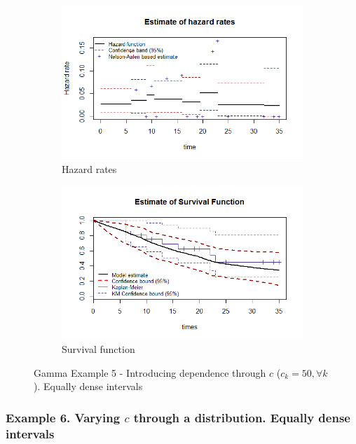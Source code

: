 \documentclass[letterpaper]{article}
\begin{document}
\begin{figure}
  \centering
  \begin{subfigure}[a]{\textwidth}\centering
    \includegraphics[width=\textwidth]{G51.png}
    \caption{Hazard rates}
  \end{subfigure}
  \begin{subfigure}[b]{\textwidth}\centering
    \includegraphics[width=\textwidth]{G52.png}
    \caption{Survival function}
  \end{subfigure}
  \caption{Gamma Example 5 - Introducing dependence through $c$ ($c_k=50, \forall k$). Equally dense intervals}
  \label{fig:G5}
\end{figure}

\subsubsection{Example 6. Varying $c$ through a distribution. Equally dense intervals}
\end{document}
